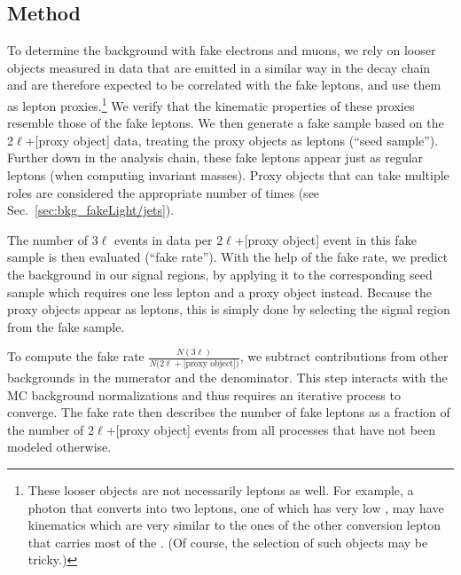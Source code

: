 \subsection{Method}
\label{sec:bkg_fakeLight}

To determine the background with fake electrons and muons, we rely on looser objects measured in data that are emitted in a similar way in the decay chain and are therefore expected to be correlated with the fake leptons, and use them as lepton proxies.\footnote{These looser objects are not necessarily leptons as well. For example, a photon that converts into two leptons, one of which has very low \pt, may have kinematics which are very similar to the ones of the other conversion lepton that carries most of the \pt. (Of course, the selection of such objects may be tricky.)} We verify that the kinematic properties of these proxies resemble those of the fake leptons. We then generate a fake sample based on the 2$\ell$+[proxy object] data, treating the proxy objects as leptons (``seed sample''). Further down in the analysis chain, these fake leptons appear just as regular leptons (\eg when computing invariant masses). Proxy objects that can take multiple roles are considered the appropriate number of times (see Sec.~\ref{sec:bkg_fakeLight/jets}).

The number of 3$\ell$ events in data per 2$\ell$+[proxy object] event in this fake sample is then evaluated (``fake rate''). With the help of the fake rate, we predict the background in our signal regions, by applying it to the corresponding seed sample which requires one less lepton and a proxy object instead. Because the proxy objects appear as leptons, this is simply done by selecting the signal region from the fake sample.

To compute the fake rate $\frac{N(3\ell)}{N(2\ell + \textrm{[proxy object])}}$, we subtract contributions from other backgrounds in the numerator and the denominator. This step interacts with the MC background normalizations and thus requires an iterative process to converge. The fake rate then describes the number of fake leptons as a fraction of the number of 2$\ell$+[proxy object] events from all processes that have not been modeled otherwise.

